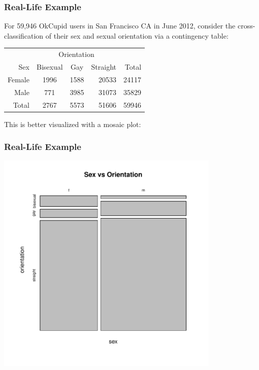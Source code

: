 \documentclass[handout]{beamer}
\newcommand{\blue}[1]{\textcolor{blue2}{#1}}
\begin{document}
\begin{frame}
\frametitle{Real-Life Example}

For 59,946 OkCupid users in San Francisco CA in June 2012, consider the cross-classification of their \blue{sex} and \blue{sexual orientation} via a contingency table:

\pause
\begin{center}
  \begin{tabular}{r|ccr|r}
& \multicolumn{3}{c|}{Orientation} & \\
       Sex & Bisexual & Gay & Straight & Total \\ 
\hline
    Female & 1996 & 1588 & 20533 & 24117 \\ 
    Male & 771 & 3985 & 31073 & 35829 \\ 
\hline
    Total & 2767 & 5573 & 51606 & 59946 \\ 
  \end{tabular}
\end{center}

\pause This is better visualized with a mosaic plot:
           
\end{frame}


\begin{frame}
\frametitle{Real-Life Example}

\begin{center}
\includegraphics[width=0.8\textwidth]{figure/sex_by_orientation-1.pdf}
\end{center}

\end{frame}
\end{document}
